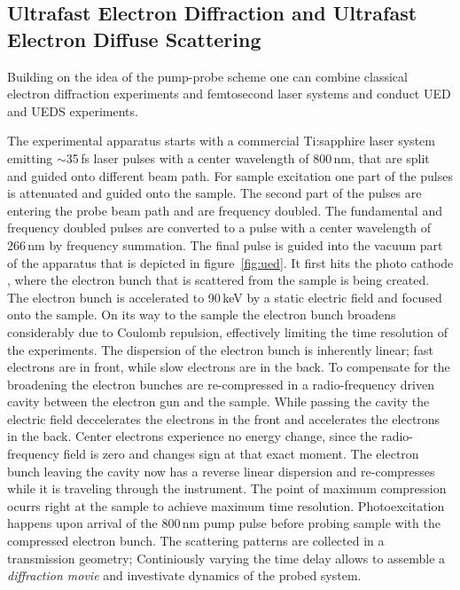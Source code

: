 \subsection{Ultrafast Electron Diffraction and Ultrafast Electron Diffuse Scattering}
Building on the idea of the pump-probe scheme one can combine classical electron diffraction experiments and femtosecond laser systems and conduct \ac{UED} and \ac{UEDS} experiments.

The experimental apparatus starts with a commercial Ti:sapphire laser system emitting $\sim$35\,fs laser pulses with a center wavelength of 800\,nm, that are split and guided onto different beam path.
For sample excitation one part of the pulses is attenuated and guided onto the sample.
The second part of the pulses are entering the probe beam path and are frequency doubled. The fundamental and frequency doubled pulses are converted to a pulse with a center wavelength of 266\,nm by frequency summation.
The final pulse is guided into the vacuum part of the apparatus that is depicted in figure~\ref{fig:ued}.
It first hits the photo cathode , where the electron bunch that is scattered from the sample is being created.
The electron bunch is accelerated to 90\,keV by a static electric field and focused onto the sample.
On its way to the sample the electron bunch broadens considerably due to Coulomb repulsion, effectively limiting the time resolution of the experiments.
The dispersion of the electron bunch is inherently linear; fast electrons are in front, while slow electrons are in the back.
To compensate for the broadening the electron bunches are re-compressed in a radio-frequency driven cavity between the electron gun and the sample.
While passing the cavity the electric field deccelerates the electrons in the front and accelerates the electrons in the back.
Center electrons experience no energy change, since the radio-frequency field is zero and changes sign at that exact moment.
The electron bunch leaving the cavity now has a reverse linear dispersion and re-compresses while it is traveling through the instrument.
The point of maximum compression ocurrs right at the sample to achieve maximum time resolution.
Photoexcitation happens upon arrival of the 800\,nm pump pulse before probing sample with the compressed electron bunch.
The scattering patterns are collected in a transmission geometry; Continiously varying the time delay allows to assemble a \emph{diffraction movie} and investivate dynamics of the probed system.

